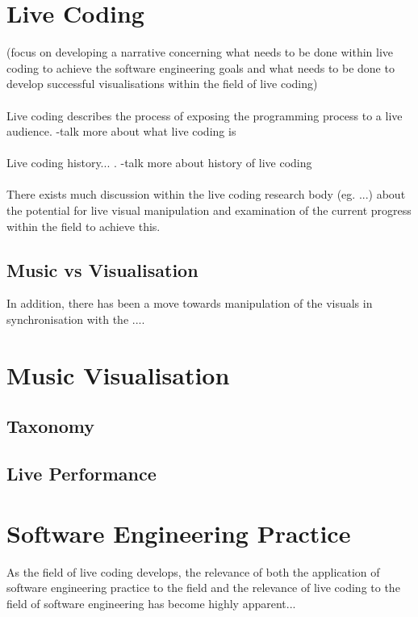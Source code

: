 \section{Live Coding}
\label{sec:livecoding}

(focus on developing a narrative concerning what needs to be done within live coding to achieve the software engineering goals and what needs to be done to develop successful visualisations within the field of live coding)
\\\\
Live coding describes the process of exposing the programming process to a live audience. -talk more about what live coding is
\\\\
Live coding history... . -talk more about history of live coding
\\\\
There exists much discussion within the live coding research body (eg. ...) about the potential for live visual manipulation and examination of the current progress within the field to achieve this.


\subsection{Music vs Visualisation}

In addition, there has been a move towards manipulation of the visuals in synchronisation with the ....


\section{Music Visualisation}
\label{sec:musicvisualisation}

\subsection{Taxonomy}

\subsection{Live Performance}


\section{Software Engineering Practice}
\label{sec:softwareengineering}

As the field of live coding develops, the relevance of both the application of software engineering practice to the field and the relevance of live coding to the field of software engineering has become highly apparent...

